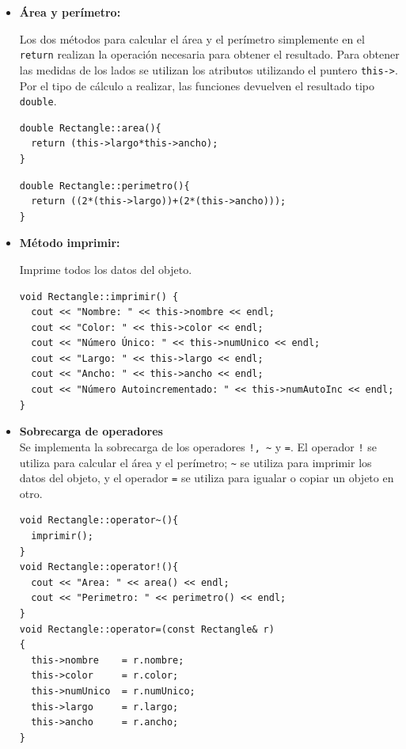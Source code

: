 \begin{itemize}
\item \textbf{Área y perímetro:}

	Los dos métodos para calcular el área y el perímetro simplemente en el \texttt{return} realizan la operación necesaria para obtener el resultado. Para obtener las medidas de los lados se utilizan los atributos utilizando el puntero \texttt{this->}. Por el tipo de cálculo a realizar, las funciones devuelven el resultado tipo \texttt{double}.
    
	\begin{verbatim}
double Rectangle::area(){
  return (this->largo*this->ancho);
}
\end{verbatim}

	\begin{verbatim}
double Rectangle::perimetro(){
  return ((2*(this->largo))+(2*(this->ancho)));
}
\end{verbatim}

\item \textbf{Método imprimir:}

	Imprime todos los datos del objeto.
    	\begin{verbatim}
void Rectangle::imprimir() {
  cout << "Nombre: " << this->nombre << endl;
  cout << "Color: " << this->color << endl;
  cout << "Número Único: " << this->numUnico << endl;
  cout << "Largo: " << this->largo << endl;
  cout << "Ancho: " << this->ancho << endl;
  cout << "Número Autoincrementado: " << this->numAutoInc << endl;
}
\end{verbatim}

\item \textbf{Sobrecarga de operadores}\\
Se implementa la sobrecarga de los operadores \texttt{!, \~} y \texttt{=}. El operador \texttt{!} se utiliza para calcular el área y el perímetro; \texttt{\~} se utiliza para imprimir los datos del objeto, y el operador \texttt{=} se utiliza para igualar o copiar un objeto en otro.

\begin{verbatim}
void Rectangle::operator~(){
  imprimir();
}
void Rectangle::operator!(){
  cout << "Area: " << area() << endl;
  cout << "Perimetro: " << perimetro() << endl;
}
void Rectangle::operator=(const Rectangle& r)
{
  this->nombre    = r.nombre;
  this->color     = r.color;
  this->numUnico  = r.numUnico;
  this->largo     = r.largo;
  this->ancho     = r.ancho;
}
\end{verbatim}


\end{itemize}



